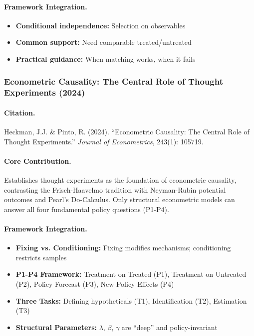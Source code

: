 \paragraph{Framework Integration.}
\begin{itemize}
  \item \textbf{Conditional independence:} Selection on observables
  \item \textbf{Common support:} Need comparable treated/untreated
  \item \textbf{Practical guidance:} When matching works, when it fails
\end{itemize}

\subsubsection{Econometric Causality: The Central Role of Thought Experiments (2024)}

\paragraph{Citation.}
Heckman, J.J. \& Pinto, R. (2024). ``Econometric Causality: The Central Role of
Thought Experiments.'' \emph{Journal of Econometrics}, 243(1): 105719.
\citep{heckman2024causality}

\paragraph{Core Contribution.}
Establishes thought experiments as the foundation of econometric causality,
contrasting the Frisch-Haavelmo tradition with Neyman-Rubin potential outcomes
and Pearl's Do-Calculus. Only structural econometric models can answer all
four fundamental policy questions (P1-P4).

\paragraph{Framework Integration.}
\begin{itemize}
  \item \textbf{Fixing vs. Conditioning:} Fixing modifies mechanisms; conditioning restricts samples
  \item \textbf{P1-P4 Framework:} Treatment on Treated (P1), Treatment on Untreated (P2),
        Policy Forecast (P3), New Policy Effects (P4)
  \item \textbf{Three Tasks:} Defining hypotheticals (T1), Identification (T2), Estimation (T3)
  \item \textbf{Structural Parameters:} $\lambda$, $\beta$, $\gamma$ are ``deep'' and policy-invariant
\end{itemize}

